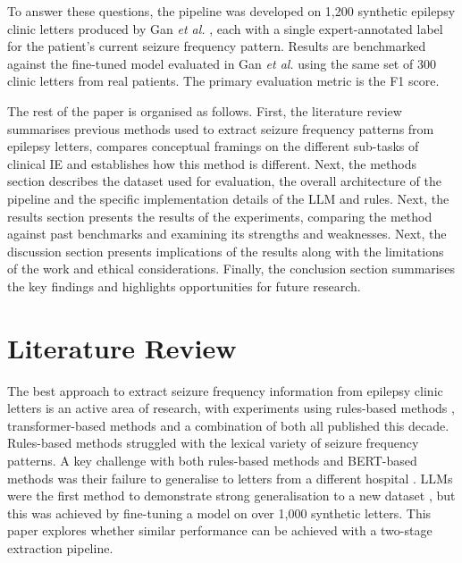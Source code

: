 \documentclass[conference]{IEEEtran}
\begin{document}
To answer these questions, the pipeline was developed on 
1,200 synthetic epilepsy clinic letters produced by Gan 
\emph{et al.} \cite{b3}, each with a single expert-annotated 
label for the patient's current seizure frequency pattern. 
Results are benchmarked against the fine-tuned model
evaluated in Gan \emph{et al.} using the same set of 300 clinic
letters from real patients. The primary evaluation metric
is the F1 score.

The rest of the paper is organised as follows. First, the
literature review summarises previous methods used to extract
seizure frequency patterns from epilepsy letters, compares
conceptual framings on the different sub-tasks of clinical IE
and establishes how this method is different. Next, the methods
section describes the dataset used for evaluation, the overall
architecture of the pipeline and the specific implementation
details of the LLM and rules. Next, the results section
presents the results of the experiments, comparing the method
against past benchmarks and examining its strengths and
weaknesses. Next, the discussion section presents implications of the results
along with the limitations of the work and ethical considerations. 
Finally, the conclusion section summarises the key
findings and highlights opportunities for future research.

\section{Literature Review}

The best approach to extract seizure frequency 
information from epilepsy clinic letters is an active area 
of research, with experiments using rules-based methods \cite{b7, b8}, 
transformer-based methods \cite{b3, b6, b9, b10} and a 
combination of both \cite{b11, b12} all published this decade. 
Rules-based methods struggled with the 
lexical variety of seizure frequency patterns. A key 
challenge with both rules-based methods and BERT-based 
methods was their failure to generalise to letters from a 
different hospital \cite{b8, b12}. LLMs were the first method
to demonstrate strong generalisation to a new dataset \cite{b3},
but this was achieved by fine-tuning a model on over 1,000
synthetic letters. This paper explores whether similar
performance can be achieved with a two-stage extraction 
pipeline.
\end{document}
